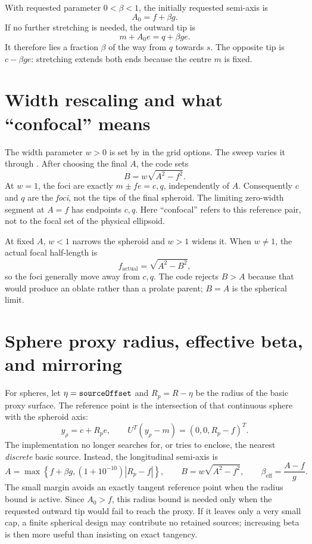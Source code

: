 \documentclass[11pt,a4paper]{article}
\newcommand{\code}[1]{\texttt{\detokenize{#1}}}
\begin{document}
With requested parameter $0<\beta<1$, the initially requested semi-axis is
\begin{equation}
 A_0=f+\beta g.
 \label{eq:requested}
\end{equation}
If no further stretching is needed, the outward tip is
\[
 m+A_0e=q+\beta g e.
\]
It therefore lies a fraction $\beta$ of the way from $q$ towards $s$.
The opposite tip is $c-\beta g e$: stretching extends both ends because the
centre $m$ is fixed.

\section{Width rescaling and what ``confocal'' means}

The width parameter $w>0$ is set by \code{sourceWidthScale} in the grid options.
The sweep varies it through \code{widthScales}.  After choosing the final $A$,
the code sets
\begin{equation}
 B=w\sqrt{A^2-f^2}.
 \label{eq:width}
\end{equation}
At $w=1$, the foci are exactly $m\pm fe=c,q$, independently of $A$.
Consequently $c$ and $q$ are the \emph{foci}, not the tips of the final spheroid.
The limiting zero-width segment at $A=f$ has endpoints $c,q$.
Here ``confocal'' refers to this reference pair, not to the focal set of the
physical ellipsoid.

At fixed $A$, $w<1$ narrows the spheroid and $w>1$ widens it.  When $w\ne1$,
the actual focal half-length is
\[
 f_{\mathrm{actual}}=\sqrt{A^2-B^2},
\]
so the foci generally move away from $c,q$.  The code rejects $B>A$ because
that would produce an oblate rather than a prolate parent; $B=A$ is the
spherical limit.

\section{Sphere proxy radius, effective beta, and mirroring}

For spheres, let $\eta=\code{sourceOffset}$ and
$R_p=R-\eta$ be the radius of the basic proxy surface.  The reference point
is the intersection of that continuous sphere with the spheroid axis:
\[
 y_\rho=c+R_p e,\qquad U^T(y_\rho-m)=(0,0,R_p-f)^T.
\]
The implementation no longer searches for, or tries to enclose, the nearest
\emph{discrete} basic source.  Instead, the longitudinal semi-axis is
\begin{equation}
 A=\max\left\{f+\beta g,(1+10^{-10})|R_p-f|\right\},
 \qquad B=w\sqrt{A^2-f^2},\qquad
 \beta_{\mathrm{eff}}=\frac{A-f}{g}.
 \label{eq:effective}
\end{equation}
The small margin avoids an exactly tangent reference point when the radius
bound is active.  Since $A_0>f$, this radius bound is needed only when the
requested outward tip would fail to reach the proxy.  If it leaves only a
very small cap, a finite spherical design may contribute no retained sources;
increasing beta is then more useful than insisting on exact tangency.
\end{document}
